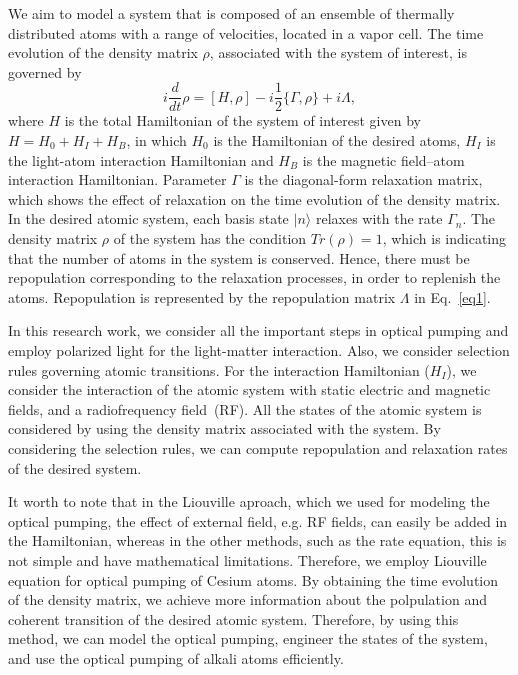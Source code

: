 \documentclass[a4paper]{article}
\begin{document}
We aim to model a system that is composed of an ensemble of thermally distributed atoms with a range of velocities, located in a vapor cell. The time evolution of the density matrix $\rho$, associated with the system of interest, is governed by~\cite{r20}
\begin{equation}\label{eq1}
i \frac{d}{dt}\rho=[H,\rho]-i \frac{1}{2}\{\Gamma, \rho\}+i \Lambda,
\end{equation}
where $H$ is the total Hamiltonian of the system of interest given by $H=H_0+H_I+H_B$, in which $H_0$ is the Hamiltonian of the desired atoms, $H_I$ is the light-atom interaction Hamiltonian and $H_B$ is the magnetic field–atom interaction Hamiltonian. Parameter $\Gamma $ is the diagonal-form relaxation matrix, which shows  the effect of relaxation on the time evolution of the density matrix. In the desired atomic system, each basis state $|n\rangle$ relaxes with the rate $\Gamma_n$.  The density matrix $\rho$ of the system has the condition $Tr(\rho)=1$,  which is indicating that the number of atoms in the system is conserved.  Hence, there must be repopulation corresponding to the relaxation processes, in order to replenish the atoms. Repopulation is represented by the repopulation matrix $\Lambda$ in Eq.~\ref{eq1}. 

In this research work, we consider all the important steps in optical pumping and employ polarized light for the light-matter interaction. Also, we consider selection rules governing atomic transitions.  For the interaction Hamiltonian ($H_I$), we consider the interaction of the atomic system with static electric and magnetic fields, and a radiofrequency field~(RF). All the states of the atomic system is considered by using the density matrix associated with the system. By considering the selection rules, we can compute repopulation and relaxation rates of the desired system.

It worth to note that in the Liouville aproach, which we used for modeling the optical pumping, the effect of external field, e.g. RF fields, can easily be added in the Hamiltonian, whereas in the other methods, such as the rate equation, this is not simple and have mathematical limitations. Therefore, we employ Liouville equation for optical pumping of Cesium atoms. By obtaining the time evolution of the density matrix, we achieve more information about the polpulation and coherent transition of the desired atomic system. Therefore, by using this method, we can model the optical pumping, engineer the states of the system, and use the optical pumping of alkali atoms efficiently.
\end{document}
